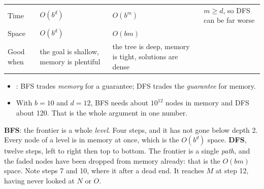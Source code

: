 {\begin{tabularx}{\linewidth}{@{}L{1.75cm}L{2.0cm}L{2.0cm}X@{}}
Time & $O(b^d)$ & $O(b^m)$ & $m \geq d$, so DFS can be far worse \\
Space & $O(b^d)$ & $O(bm)$ &  \\
Good when & the goal is shallow, memory is plentiful & the tree is deep, memory is tight, solutions are dense & \\
\bottomrule
\end{tabularx}
\vspace{2pt}
\begin{itemize}
  \item {}: BFS trades
        \emph{memory} for a guarantee; DFS trades the \emph{guarantee} for memory.
  \item With $b = 10$ and $d = 12$, BFS needs about $10^{12}$ nodes in memory and DFS
        about 120. That is the whole argument in one number.
\end{itemize}}

\vspace{3pt}
{\color{sub}\footnotesize \textbf{BFS}: the frontier is a whole \emph{level}. Four steps,
and it has not gone below depth 2. Every node of a level is in memory at once, which is
the $O(b^d)$ space.}
\vspace{3pt}
{\color{sub}\footnotesize \textbf{DFS}, twelve steps, left to right then top to bottom.
The frontier is a single \emph{path}, and the faded nodes have been dropped from memory
already: that is the $O(bm)$ space. Note steps 7 and 10, where it  after a dead end. It reaches $M$ at step 12, having never looked at $N$ or $O$.}

\vspace{2pt}

